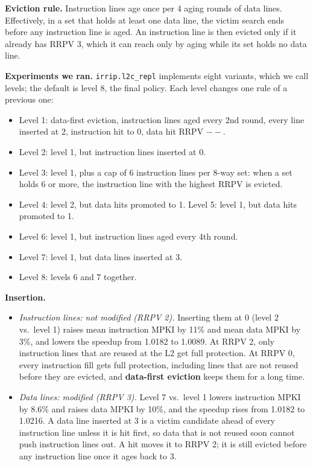 \textbf{Eviction rule.} Instruction lines age once per 4 aging rounds of data lines. Effectively, in a set that holds at least one data line, the victim search ends before any instruction line is aged. An instruction line is then evicted only if it already has RRPV 3, which it can reach only by aging while its set holds no data line.

\textbf{Experiments we ran.} \texttt{irrip.l2c\_repl} implements eight variants, which we call levels; the default is level 8, the final policy. Each level changes one rule of a previous one:

\begin{itemize}
  \item Level 1: data-first eviction, instruction lines aged every 2nd round, every line inserted at 2, instruction hit to 0, data hit RRPV $--$.
  \item Level 2: level 1, but instruction lines inserted at 0.
  \item Level 3: level 1, plus a cap of 6 instruction lines per 8-way set: when a set holds 6 or more, the instruction line with the highest RRPV is evicted.
  \item Level 4: level 2, but data hits promoted to 1. Level 5: level 1, but data hits promoted to 1.
  \item Level 6: level 1, but instruction lines aged every 4th round.
  \item Level 7: level 1, but data lines inserted at 3.
  \item Level 8: levels 6 and 7 together.
\end{itemize}

\begin{table}[H]
\centering
\small

\caption{Every level, averaged over the three traces. Speedup is over LRU (geometric mean). MPKI columns are arithmetic means; ratio columns are each MPKI relative to SRRIP (geometric mean of the per-trace ratios). Percentages in the text compare the MPKI columns.}
\end{table}

\textbf{Insertion.}
\begin{itemize}
  \item \emph{Instruction lines: not modified (RRPV 2).} Inserting them at 0 (level 2 vs.\ level 1) raises mean instruction MPKI by 11\% and mean data MPKI by 3\%, and lowers the speedup from 1.0182 to 1.0089. At RRPV 2, only instruction lines that are reused at the L2 get full protection. At RRPV 0, every instruction fill gets full protection, including lines that are not reused before they are evicted, and \textbf{data-first eviction} keeps them for a long time.
  \item \emph{Data lines: modified (RRPV 3).} Level 7 vs.\ level 1 lowers instruction MPKI by 8.6\% and raises data MPKI by 10\%, and the speedup rises from 1.0182 to 1.0216. A data line inserted at 3 is a victim candidate ahead of every instruction line unless it is hit first, so data that is not reused soon cannot push instruction lines out. A hit moves it to RRPV 2; it is still evicted before any instruction line once it ages back to 3.
\end{itemize}

